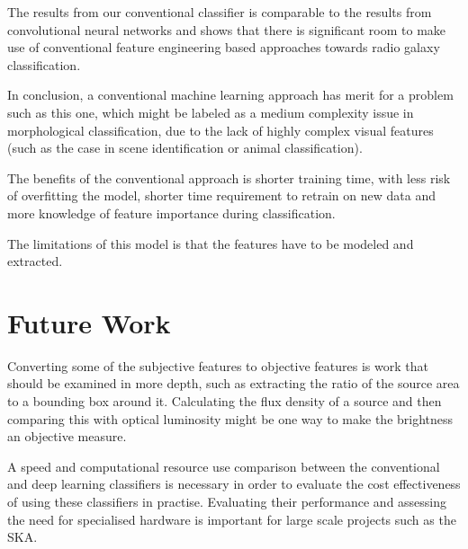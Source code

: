 \documentclass[conference]{IEEEtran}
\begin{document}
The results from our conventional classifier is comparable to the results from convolutional neural networks and shows that there is significant room to make use of conventional feature engineering based approaches towards radio galaxy classification. 


In conclusion, a conventional machine learning approach has merit for a problem such as this one, which might be labeled as a medium complexity issue in morphological classification, due to the lack of highly complex visual features (such as the case in scene identification or animal classification). 

The benefits of the conventional approach is shorter training time, with less risk of overfitting the model, shorter time requirement to retrain on new data and more knowledge of feature importance during classification.

The limitations of this model is that the features have to be modeled and extracted.

\section{Future Work}

Converting some of the subjective features to objective features is work that should be examined in more depth, such as extracting the ratio of the source area to a bounding box around it. Calculating the flux density of a source and then comparing this with optical luminosity might be one way to make the brightness an objective measure.

A speed and computational resource use comparison between the conventional and deep learning classifiers is necessary in order to evaluate the cost effectiveness of using these classifiers in practise. Evaluating their performance and assessing the need for specialised hardware is important for large scale projects such as the SKA.
\end{document}
